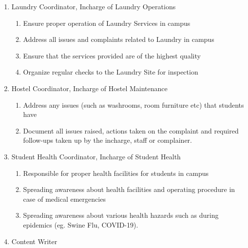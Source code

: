 \documentclass[12pt]{article}
\begin{document}
\begin{enumerate}
\begin{enumerate}
        \item Ensure highest quality of hygiene and quality of products is maintained in all the outlets
        \item Survey prices and quality of food served and other items sold around the campus as well as in other colleges (including but not limited to IITs).
        \item Search for new potential vendors in case existing vendors are discontinuing operations.
        \item Ensure sufficient variety in food and other items provided in canteens
    \end{enumerate}
    \item Laundry Coordinator, Incharge of Laundry Operations
    \begin{enumerate}
        \item Ensure proper operation of Laundry Services in campus
        \item Address all issues and complaints related to Laundry in campus
        \item Ensure that the services provided are of the highest quality
        \item Organize regular checks to the Laundry Site for inspection
    \end{enumerate}
    \item Hostel Coordinator, Incharge of Hostel Maintenance
    \begin{enumerate}
        \item Address any issues (such as washrooms, room furniture etc) that students have
        \item Document all issues raised, actions taken on the complaint and required follow-ups taken up by the incharge, staff or complainer.
    \end{enumerate}
    \item Student Health Coordinator, Incharge of Student Health
    \begin{enumerate}
        \item Responsible for proper health facilities for students in campus
        \item Spreading awareness about health facilities and operating procedure in case of medical emergencies
        \item Spreading awareness about various health hazards such as during epidemics (eg. Swine Flu, COVID-19).
    \end{enumerate}
    \item Content Writer

\end{enumerate}
\end{document}
